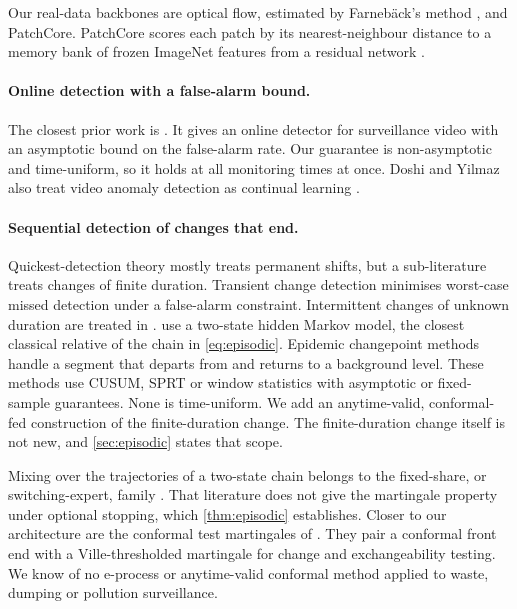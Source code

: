 Our real-data backbones are optical flow, estimated by Farneb\"{a}ck's method
\citep{farneback2003}, and PatchCore. PatchCore scores each patch by its
nearest-neighbour distance to a memory bank of frozen ImageNet features from a
residual network \citep{roth2022total,he2016deep}.

\paragraph{Online detection with a false-alarm bound.}
The closest prior work is \citet{doshi2021online}. It gives an online detector for
surveillance video with an asymptotic bound on the false-alarm rate. Our guarantee
is non-asymptotic and time-uniform, so it holds at all monitoring times at once.
Doshi and Yilmaz also treat video anomaly detection as continual learning
\citep{doshi2022rethinking}.

\paragraph{Sequential detection of changes that end.}
Quickest-detection theory mostly treats permanent shifts, but a sub-literature
treats changes of finite duration. Transient change detection
\citep{guepie2012transient,guepie2017transient} minimises worst-case missed
detection under a false-alarm constraint. Intermittent changes of unknown duration
are treated in \citet{sokolov2023intermittent}. \citet{fuh2015hmm} use a two-state
hidden Markov model, the closest classical relative of the chain in
\cref{eq:episodic}. Epidemic changepoint methods \citep{fisch2022capa,juodakis2020epidemic}
handle a segment that departs from and returns to a background level. These methods
use CUSUM, SPRT or window statistics with asymptotic or fixed-sample guarantees.
None is time-uniform. We add an anytime-valid, conformal-fed construction of the
finite-duration change. The finite-duration change itself is not new, and
\cref{sec:episodic} states that scope.

Mixing over the trajectories of a two-state chain belongs to the fixed-share, or
switching-expert, family \citep{herbster1998fixedshare,vanerven2012switch}. That
literature does not give the martingale property under optional stopping, which
\cref{thm:episodic} establishes. Closer to our architecture are the conformal test
martingales of \citet{vovk2003exchangeability}. They pair a conformal front end with
a Ville-thresholded martingale for change and exchangeability testing. We know of no
e-process or anytime-valid conformal method applied to waste, dumping or pollution
surveillance.

